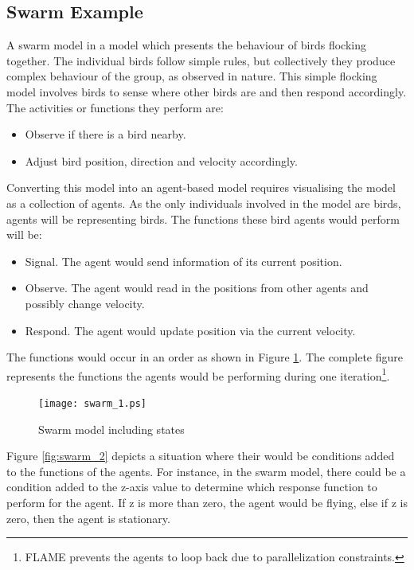 \documentclass[a4paper,11pt]{article}
\begin{document}
\subsection{Swarm Example}

A swarm model in a model which presents the behaviour of birds
flocking together. The individual birds follow simple rules, but
collectively they produce complex behaviour of the group, as
observed in nature. This simple flocking model involves birds to
sense where other birds are and then respond accordingly. The
activities or functions they perform are:

\begin{itemize}
\item Observe if there is a bird nearby.
\item Adjust bird position, direction and velocity accordingly.
\end{itemize}


Converting this model into an agent-based model requires visualising
the model as a collection of agents. As the only individuals
involved in the model are birds, agents will be representing birds.
The functions these bird agents would perform will be:

\begin{itemize}
\item Signal. The agent would send information of its current
position.
\item Observe. The agent would read in the positions from other agents and possibly change
velocity.
\item Respond. The agent would update position via the current
velocity.
\end{itemize}

The functions would occur in an order as shown in Figure
\ref{fig:swarm_1}. The complete figure represents the functions the
agents would be performing during one iteration\footnote{FLAME
prevents the agents to loop back due to parallelization
constraints.}.



\begin{figure}[ht]
\begin{center}
\texttt{[image: swarm\_1.ps]}
\caption{Swarm model including states} \label{fig:swarm_1}
\end{center}
\end{figure}

Figure \ref{fig:swarm_2} depicts a situation where their would be
conditions added to the functions of the agents. For instance, in
the swarm model, there could be a condition added to the z-axis
value to determine which response function to perform for the agent.
If z is more than zero, the agent would be flying, else if z is
zero, then the agent is stationary.
\end{document}

